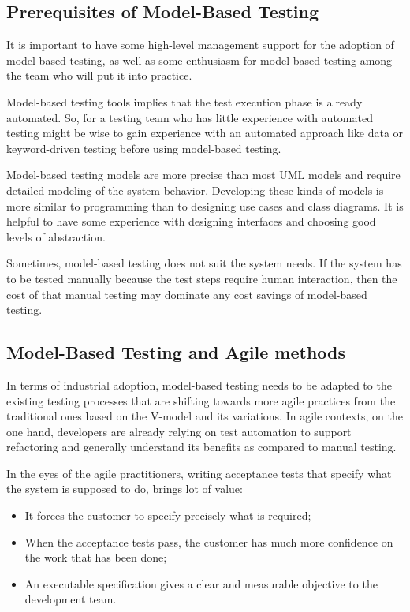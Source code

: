 \subsection{Prerequisites of Model-Based Testing}

It is important to have some high-level management support for the adoption of model-based testing, as well as some enthusiasm for model-based testing among the team who will put it into practice.

Model-based testing tools implies that the test execution phase is already automated. So, for a testing team who has little experience with automated testing might be wise to gain experience with an automated approach like data or keyword-driven testing before using model-based testing.

Model-based testing models are more precise than most UML models and require detailed modeling of the system behavior. Developing these kinds of models is more similar to programming than to designing use cases and class diagrams. It is helpful to have some experience with designing interfaces and choosing good levels of abstraction.

Sometimes, model-based testing does not suit the system needs. If the system has to be tested manually because the test steps require human interaction, then the cost of that manual testing may dominate any cost savings of model-based testing.

\subsection{Model-Based Testing and Agile methods}

In terms of industrial adoption, model-based testing needs to be adapted to the
existing testing processes that are shifting towards more agile practices
from the traditional ones based on the V-model and its variations. In agile
contexts, on the one hand, developers are already relying on test automation to
support refactoring and generally understand its benefits as compared to manual
testing.

In the eyes of the agile practitioners, writing acceptance tests
that specify what the system is supposed to do, brings lot of value:
\begin{itemize}
\item It forces the customer to specify precisely what is required;
\item When the acceptance tests pass, the customer has much more confidence on
the work that has been done;
\item An executable specification gives a clear and measurable 
objective to the development team.
\end{itemize}

